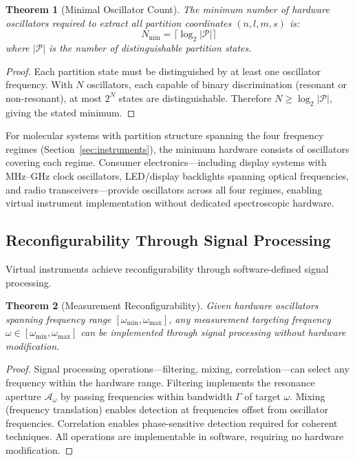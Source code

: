 \documentclass[twocolumn,10pt,a4paper]{article}
\newtheorem{theorem}{Theorem}[section]
\theoremstyle{definition}
\theoremstyle{remark}
\newcommand{\partition}{\mathcal{P}}
\newcommand{\aperture}{\mathcal{A}}
\begin{document}
\begin{theorem}[Minimal Oscillator Count]
\label{thm:min_oscillators}
The minimum number of hardware oscillators required to extract all partition coordinates $(n, l, m, s)$ is:
\begin{equation}
N_{\mathrm{min}} = \lceil \log_2 |\partition| \rceil
\end{equation}
where $|\partition|$ is the number of distinguishable partition states.
\end{theorem}

\begin{proof}
Each partition state must be distinguished by at least one oscillator frequency. With $N$ oscillators, each capable of binary discrimination (resonant or non-resonant), at most $2^N$ states are distinguishable. Therefore $N \geq \log_2 |\partition|$, giving the stated minimum.
\end{proof}

For molecular systems with partition structure spanning the four frequency regimes (Section~\ref{sec:instruments}), the minimum hardware consists of oscillators covering each regime. Consumer electronics—including display systems with MHz–GHz clock oscillators, LED/display backlights spanning optical frequencies, and radio transceivers—provide oscillators across all four regimes, enabling virtual instrument implementation without dedicated spectroscopic hardware.

\subsection{Reconfigurability Through Signal Processing}

Virtual instruments achieve reconfigurability through software-defined signal processing.

\begin{theorem}[Measurement Reconfigurability]
\label{thm:reconfigurability}
Given hardware oscillators spanning frequency range $[\omega_{\mathrm{min}}, \omega_{\mathrm{max}}]$, any measurement targeting frequency $\omega \in [\omega_{\mathrm{min}}, \omega_{\mathrm{max}}]$ can be implemented through signal processing without hardware modification.
\end{theorem}

\begin{proof}
Signal processing operations—filtering, mixing, correlation—can select any frequency within the hardware range. Filtering implements the resonance aperture $\aperture_\omega$ by passing frequencies within bandwidth $\Gamma$ of target $\omega$. Mixing (frequency translation) enables detection at frequencies offset from oscillator frequencies. Correlation enables phase-sensitive detection required for coherent techniques. All operations are implementable in software, requiring no hardware modification.
\end{proof}
\end{document}
